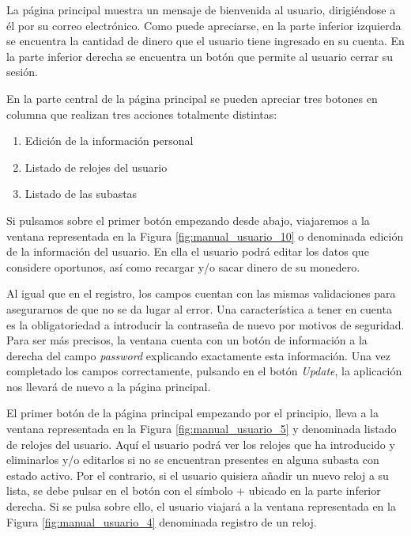 
	La página principal muestra un mensaje de bienvenida al usuario, dirigiéndose a él por su correo electrónico. Como puede apreciarse, en la parte inferior izquierda se encuentra la cantidad de dinero que el usuario tiene ingresado en su cuenta. En la parte inferior derecha se encuentra un botón que permite al usuario cerrar su sesión.
	
	En la parte central de la página principal se pueden apreciar tres botones en columna que realizan tres acciones totalmente distintas:
	\begin{enumerate}
		\item Edición de la información personal
		\item Listado de relojes del usuario
		\item Listado de las subastas
	\end{enumerate}
	
	Si pulsamos sobre el primer botón empezando desde abajo, viajaremos a la ventana representada en la Figura \ref{fig:manual_usuario_10} o denominada edición de la información del usuario. En ella el usuario podrá editar los datos que considere oportunos, así como recargar y/o sacar dinero de su monedero.
	

	Al igual que en el registro, los campos cuentan con las mismas validaciones para asegurarnos de que no se da lugar al error. Una característica a tener en cuenta es la obligatoriedad a introducir la contraseña de nuevo por motivos de seguridad. Para ser más precisos, la ventana cuenta con un botón de información a la derecha del campo \emph{password} explicando exactamente esta información. Una vez completado los campos correctamente, pulsando en el botón \emph{Update}, la aplicación nos llevará de nuevo a la página principal.
	
	El primer botón de la página principal empezando por el principio, lleva a la ventana representada en la Figura \ref{fig:manual_usuario_5} y denominada listado de relojes del usuario. Aquí el usuario podrá ver los relojes que ha introducido y eliminarlos y/o editarlos si no se encuentran presentes en alguna subasta con estado activo. Por el contrario, si el usuario quisiera añadir un nuevo reloj a su lista, se debe pulsar en el botón con el símbolo + ubicado en la parte inferior derecha. Si se pulsa sobre ello, el usuario viajará a la ventana representada en la Figura \ref{fig:manual_usuario_4} denominada registro de un reloj.

